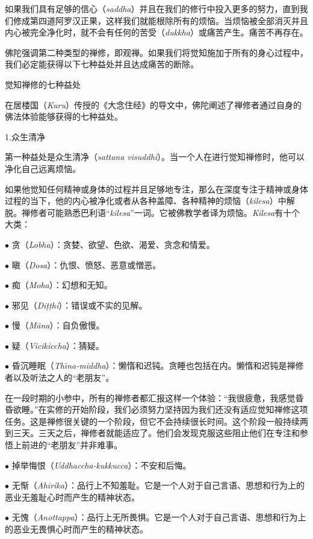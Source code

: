 如果我们具有足够的信心（{\it saddha}）并且在我们的修行中投入更多的努力，直到我们修成第四道阿罗汉正果，这样我们就能根除所有的烦恼。当烦恼被全部消灭并且内心被完全净化时，就不会有任何的苦受（{\it dukkha}）或痛苦产生。痛苦不再存在。

佛陀强调第二种类型的禅修，即观禅。如果我们将觉知施加于所有的身心过程中，我们必定能获得以下七种益处并且达成痛苦的断除。

\ssubsectnon 觉知禅修的七种益处

在居楼国（{\it Kuru}）传授的《大念住经》的导文中，佛陀阐述了禅修者通过自身的佛法体验能够获得的七种益处。

\sssubsectnon 1.众生清净

第一种益处是众生清净（{\it sattana visuddhi}）。当一个人在进行觉知\1禅修时，他可以净化自己远离烦恼。

如果他觉知任何精神或身体的过程并且足够地专注，那么在深度专注于精神或身体过程的当下，他的内心被净化或者从各种盖障、各种精神的烦恼（{\it kilesa}）中解脱。禅修者可能熟悉巴利语“{\it kilesa}”一词。它被佛教学者译为烦恼。{\it Kilesa}有十个大类：

{
\leftskip=1.6pc
\item{$\bullet$} 贪（{\it Lobha}）：贪婪、欲望、色欲、渴爱、贪念和情爱。
\item{$\bullet$} 瞋（{\it Dosa}）：仇恨、愤怒、恶意或憎恶。
\item{$\bullet$} 痴（{\it Moha}）：幻想和无知。
\item{$\bullet$} 邪见（{\it Di\d t\d thi}）：错误或不实的见解。
\item{$\bullet$} 慢（{\it M\=ana}）：自负傲慢。
\item{$\bullet$} 疑（{\it Vicikiccha}）：猜疑。
\item{$\bullet$} 昏沉睡眠（{\it Th\=\i na-middha}）：懒惰和迟钝。贪睡也包括在内。懒惰和迟钝是禅修者以及听法之人的“老朋友”。

}

在一段时期的小参中，所有的禅修者都汇报这样一个体验：“我很疲惫，我感觉昏昏欲睡。”在实修的开始阶段，我们必须努力坚持因为我们还没有适应觉知禅修这项任务。这是禅修很关键的一个阶段，但它不会持续很长时间。这个阶段一般持续两到三天。三天之后，禅修者就能适应了。他们会发现克服这些阻止他们在专注和参悟上前进的“老朋友”并非难事。

{
\leftskip=1.6pc
\item{$\bullet$} 掉举悔恨（{\it Uddhaccha-kukkucca}）：不安和后悔。
\item{$\bullet$} 无惭（{\it Ahirika}）：品行上不知羞耻。它是\1一个人对于自己言语、思想和行为上的恶业无羞耻心时而产生的精神状态。
\item{$\bullet$} 无愧（{\it Anottappa}）：品行上无所畏惧。它是一个人对于自己言语、思想和行为上的恶业无畏惧心时而产生的精神状态。

}

